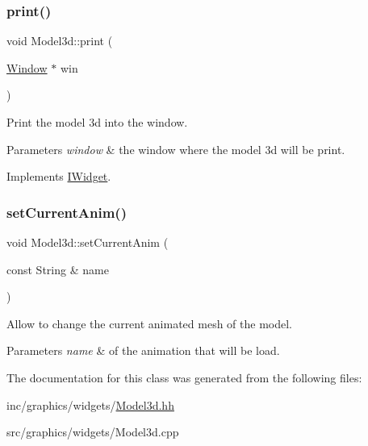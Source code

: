 \subsubsection{\texorpdfstring{print()}{print()}}
{\footnotesize\ttfamily void Model3d\+::print (\begin{DoxyParamCaption}\item[{\hyperlink{classWindow}{Window} $\ast$}]{win }\end{DoxyParamCaption})\hspace{0.3cm}{\ttfamily [virtual]}}



Print the model 3d into the window. 


\begin{DoxyParams}{Parameters}
{\em \textquotesingle{}window\textquotesingle{}} & the window where the model 3d will be print. \\
\hline
\end{DoxyParams}


Implements \hyperlink{classIWidget_a0cfa49a402e9bb31808a715e048ab2f4}{I\+Widget}.

\mbox{\label{classModel3d_a29eeaa6769b0c21268f4704ac2d404b7}} 
\subsubsection{\texorpdfstring{set\+Current\+Anim()}{setCurrentAnim()}}
{\footnotesize\ttfamily void Model3d\+::set\+Current\+Anim (\begin{DoxyParamCaption}\item[{const String \&}]{name }\end{DoxyParamCaption})}



Allow to change the current animated mesh of the model. 


\begin{DoxyParams}{Parameters}
{\em \textquotesingle{}name\textquotesingle{}} & of the animation that will be load. \\
\hline
\end{DoxyParams}


The documentation for this class was generated from the following files\+:\begin{DoxyCompactItemize}
\item 
inc/graphics/widgets/\hyperlink{Model3d_8hh}{Model3d.\+hh}\item 
src/graphics/widgets/Model3d.\+cpp\end{DoxyCompactItemize}
